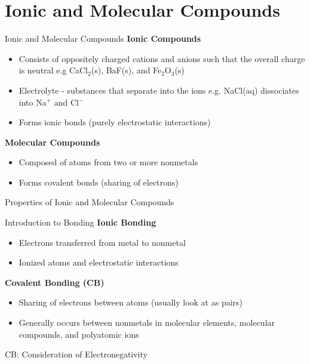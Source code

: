 \documentclass[11pt]{beamer}
\begin{document}
\section{Ionic and Molecular Compounds}

\begin{frame}{Ionic and Molecular Compounds}
  \textbf{Ionic Compounds}
  \begin{itemize}
  \item Consists of oppositely charged cations and anions
    such that the overall charge is neutral e.g CaCl$_2$(s),
    BaF(s), and Fe$_2$O$_3$(s)
  \item Electrolyte - substances that separate into the ions
    e.g. NaCl(aq) dissociates into Na$^+$ and Cl$^-$
  \item Forms ionic bonds (purely electrostatic interactions)
  \end{itemize}

  \textbf{Molecular Compounds}
  \begin{itemize}
  \item Composed of atoms from two or more nonmetals
  \item Forms covalent bonds (sharing of electrons)
  \end{itemize}
\end{frame}

\begin{frame}{Properties of Ionic and Molecular Compounds}
\end{frame}

\begin{frame}{Introduction to Bonding}
  \textbf{Ionic Bonding}
  \begin{itemize}
  \item Electrons transferred from metal
    to nonmetal
  \item Ionized atoms and electrostatic interactions
  \end{itemize}

  \textbf{Covalent Bonding (CB)}
  \begin{itemize}
  \item Sharing of electrons between atoms (usually
    look at as pairs)
  \item Generally occurs between nonmetals in molecular
    elements, molecular compounds, and polyatomic ions
  \end{itemize}
\end{frame}

\begin{frame}{CB: Consideration of Electronegativity}
\end{frame}
\end{document}
